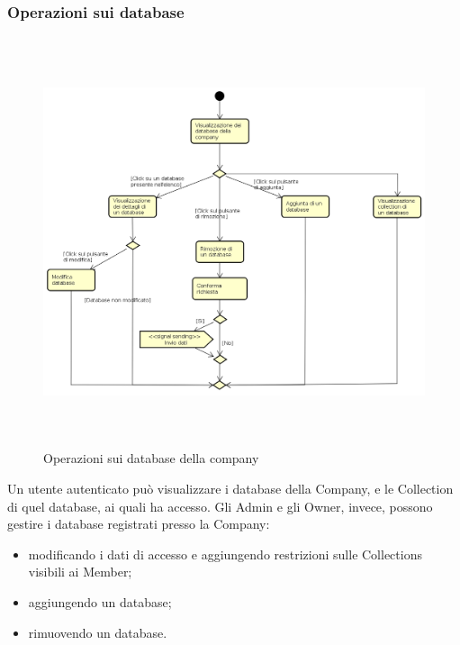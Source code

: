 \subsubsection{Operazioni sui database}
\begin{figure}[H]
\begin{center}
\includegraphics[height=12cm]{res/sections/backend/activities/gestioneDatabase.png}
\caption{Operazioni sui database della company}
\end{center}
\end{figure}
Un utente autenticato può visualizzare i database della Company, e le Collection di quel database, ai quali ha accesso. Gli Admin e gli Owner, invece, possono gestire i database registrati presso la Company:
\begin{itemize}
\item modificando i dati di accesso e aggiungendo restrizioni sulle Collections visibili ai Member;
\item aggiungendo un database;
\item rimuovendo un database.
\end{itemize} 
